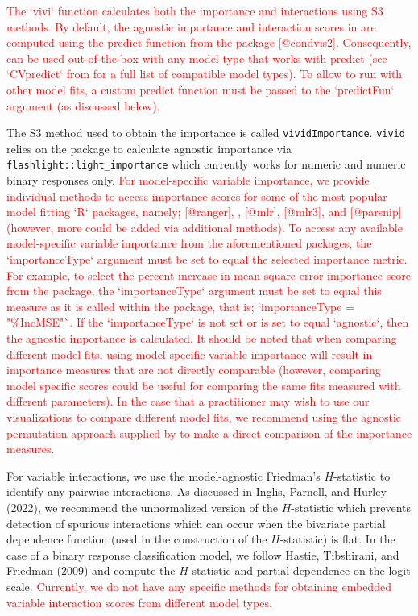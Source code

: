 \textcolor{red}{The `vivi` function calculates both the importance and interactions using S3 methods. By default, the agnostic importance and interaction scores in  are computed using the predict function from the  package [@condvis2]. Consequently,  can be used out-of-the-box with any model type that works with  predict (see `CVpredict` from  for a full list of compatible model types). To allow  to run with other model fits, a custom predict function must be passed to the `predictFun` argument (as discussed below).}

The S3 method used to obtain the importance is called \texttt{vividImportance}. \texttt{vivid} relies on the  package to calculate agnostic importance via \texttt{flashlight::light\_importance} which currently works for numeric and numeric binary responses only. \textcolor{red}{For model-specific variable importance, we provide individual methods to access importance scores for some of the most popular model fitting `R` packages, namely;  [@ranger], ,  [@mlr],  [@mlr3], and  [@parsnip] (however, more could be added via additional methods). To access any available model-specific variable importance from the aforementioned packages, the `importanceType` argument must be set to equal the selected importance metric. For example, to select the percent increase in mean square error importance score from the  package, the `importanceType` argument must be set to equal this measure as it is called within the   package, that is; `importanceType = "\%IncMSE"`. If the `importanceType` is not set or is set to equal `agnostic`, then the agnostic importance is calculated. It should be noted that when comparing different model fits, using model-specific variable importance will result in importance measures that are not directly comparable (however, comparing model specific scores could be useful for comparing the same fits measured with different parameters). In the case that a practitioner may wish to use our visualizations to compare different model fits, we recommend using the agnostic permutation approach supplied by  to make a direct comparison of the importance measures.}

For variable interactions, we use the model-agnostic Friedman's \(H\)-statistic to identify any pairwise interactions. As discussed in Inglis, Parnell, and Hurley (2022), we recommend the unnormalized version of the \(H\)-statistic which prevents detection of spurious interactions which can occur when the bivariate partial dependence function (used in the construction of the \(H\)-statistic) is flat. In the case of a binary response classification model, we follow Hastie, Tibshirani, and Friedman (2009) and compute the \(H\)-statistic and partial dependence on the logit scale. \textcolor{red}{Currently, we do not have any specific methods for obtaining embedded variable interaction scores from different model types.}

